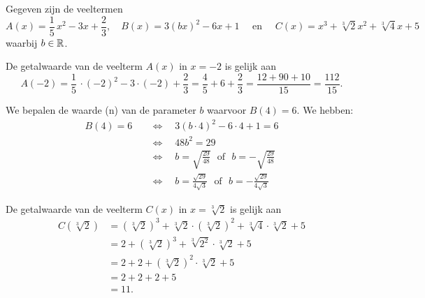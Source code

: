 \documentclass{ximera}
\begin{document}
\begin{example} 
Gegeven zijn de veeltermen
\[
A(x) = \frac{1}{5}\,x^2-3x+\frac{2}{3}, \quad B(x) = 3(bx)^2-6x+1 \quad \text{ en } \quad C(x) = x^3 + \sqrt[3]{2} x^2 + \sqrt[3]{4}x+5
\]
waarbij $b \in \mathbb{R}$. 


\begin{question}

De getalwaarde van de veelterm $A(x)$ in $x = -2$ is gelijk aan
\[
A(-2) = \frac{1}{5}\,\cdot (-2)^2-3\cdot(-2)+\frac{2}{3} = \frac{4}{5} +6+ \frac{2}{3} = \frac{12 + 90 + 10}{15} = \frac{112}{15}.
\]
\end{question}

\begin{question}
We bepalen de waarde (n) van de parameter $b$ waarvoor $B(4) = 6$. We hebben:
\begin{align*}
B(4) = 6 \quad 
& \Leftrightarrow \quad 3(b\cdot 4)^2-6\cdot 4+1 = 6 \\ 
& \Leftrightarrow \quad 48b^2 = 29 \\
& \Leftrightarrow \quad b = \sqrt{\frac{29}{48}} \,\,\text{ of }\,\, b = - \sqrt{\frac{29}{48}} \\
& \Leftrightarrow \quad b = \frac{\sqrt{29}}{4\sqrt{3}} \,\,\text{ of }\,\, b = - \frac{\sqrt{29}}{4\sqrt{3}}
\end{align*}
\end{question}

\begin{question}
De getalwaarde van de veelterm $C(x)$ in $x = \sqrt[3]{2}$ is gelijk aan
\begin{align*}
C(\sqrt[3]{2}) & = (\sqrt[3]{2})^3 + \sqrt[3]{2}\cdot(\sqrt[3]{2})^2 + \sqrt[3]{4}\cdot \sqrt[3]{2}+5 \\
& = 2 + (\sqrt[3]{2})^3 + \sqrt[3]{2^2}\cdot \sqrt[3]{2} + 5 \\
& = 2 + 2 + (\sqrt[3]{2})^2 \cdot \sqrt[3]{2} + 5 \\
& = 2 + 2 + 2 + 5 \\
& = 11.
\end{align*}
\end{question}
\end{example} 
\end{document}
